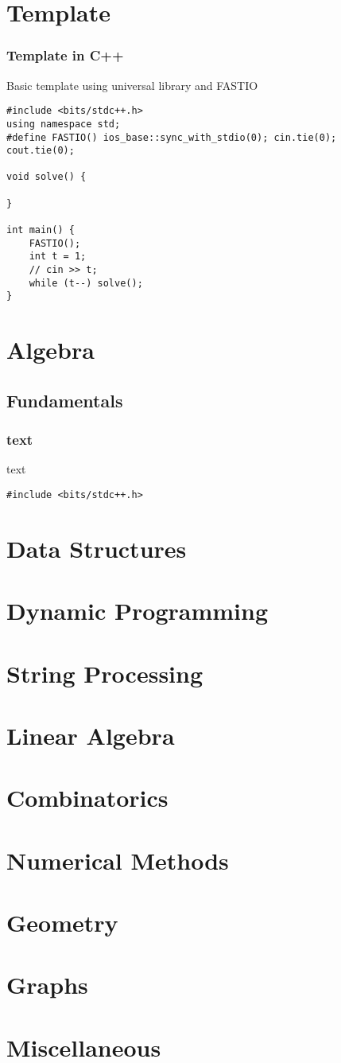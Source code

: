 \section{Template}
\subsubsection{Template in C++ }
Basic template using universal library and FASTIO

\begin{lstlisting}
#include <bits/stdc++.h>
using namespace std;
#define FASTIO() ios_base::sync_with_stdio(0); cin.tie(0); cout.tie(0);

void solve() {
    
}
 
int main() {
    FASTIO();
    int t = 1;
    // cin >> t;
    while (t--) solve();
}   
\end{lstlisting}

\section{Algebra}
\subsection{Fundamentals}
\subsubsection{text }
text

\begin{lstlisting}
#include <bits/stdc++.h>
\end{lstlisting}

\section{Data Structures}
\section{Dynamic Programming}
\section{String Processing}
\section{Linear Algebra}
\section{Combinatorics}
\section{Numerical Methods}
\section{Geometry}
\section{Graphs}
\section{Miscellaneous}
